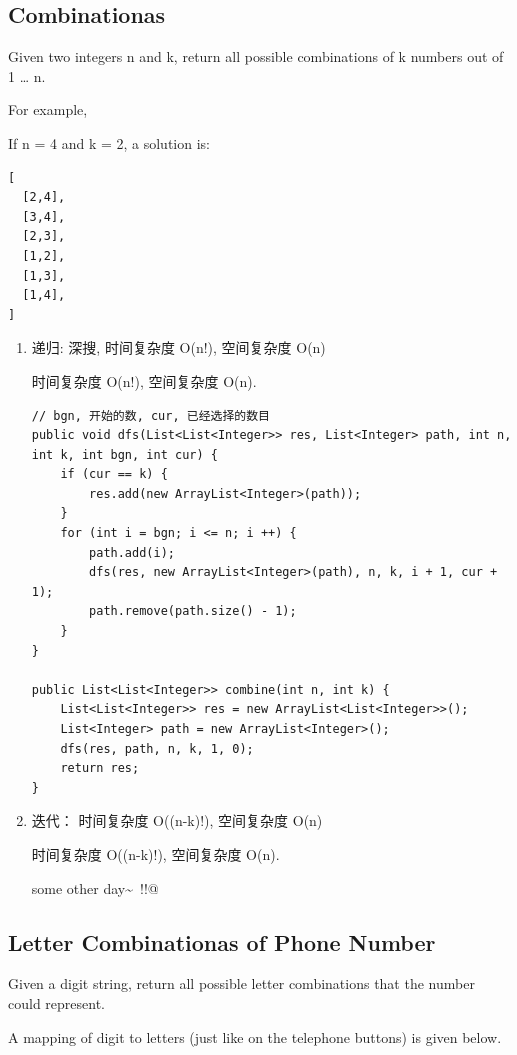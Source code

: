 \documentclass[12pt]{book}
\begin{document}
\subsection{Combinationas}
\label{sec-9-1-4}
Given two integers n and k, return all possible combinations of k numbers out of 1 \ldots{} n.

For example,

If n = 4 and k = 2, a solution is:
\lstset{language=java,label= ,caption= ,numbers=none}
\begin{lstlisting}
[
  [2,4],
  [3,4],
  [2,3],
  [1,2],
  [1,3],
  [1,4],
]
\end{lstlisting}
\begin{enumerate}
\item 递归: 深搜, 时间复杂度 O(n!), 空间复杂度 O(n)
\label{sec-9-1-4-1}

时间复杂度 O(n!), 空间复杂度 O(n). 
\lstset{language=java,label= ,caption= ,numbers=none}
\begin{lstlisting}
// bgn, 开始的数, cur, 已经选择的数目
public void dfs(List<List<Integer>> res, List<Integer> path, int n, int k, int bgn, int cur) {
    if (cur == k) {
        res.add(new ArrayList<Integer>(path));
    }
    for (int i = bgn; i <= n; i ++) {
        path.add(i);
        dfs(res, new ArrayList<Integer>(path), n, k, i + 1, cur + 1);
        path.remove(path.size() - 1);
    }
}

public List<List<Integer>> combine(int n, int k) {
    List<List<Integer>> res = new ArrayList<List<Integer>>();
    List<Integer> path = new ArrayList<Integer>();
    dfs(res, path, n, k, 1, 0); 
    return res;
}
\end{lstlisting}
\item 迭代： 时间复杂度 O((n-k)!), 空间复杂度 O(n)
\label{sec-9-1-4-2}

时间复杂度 O((n-k)!), 空间复杂度 O(n). 

some other day\textasciitilde{}~!!@
\end{enumerate}

\subsection{Letter Combinationas of Phone Number}
\label{sec-9-1-5}
Given a digit string, return all possible letter combinations that the number could represent.

A mapping of digit to letters (just like on the telephone buttons) is given below.
\end{document}
